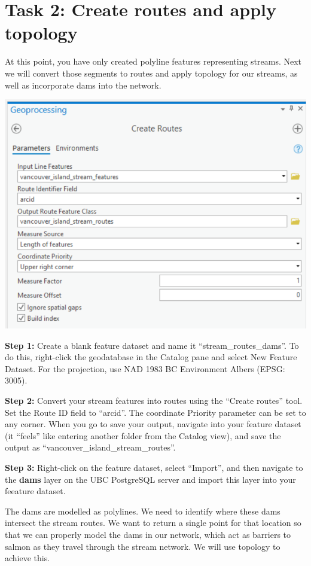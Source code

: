 \documentclass[
]{book}
\begin{document}
\hypertarget{task-2-create-routes-and-apply-topology}{%
\section*{Task 2: Create routes and apply topology}\label{task-2-create-routes-and-apply-topology}}

At this point, you have only created polyline features representing streams. Next we will convert those segments to routes and apply topology for our streams, as well as incorporate dams into the network.

\includegraphics[width=0.75\linewidth]{images/02-create-routes}

\textbf{Step 1:} Create a blank feature dataset and name it ``stream\_routes\_dams''. To do this, right-click the geodatabase in the Catalog pane and select New Feature Dataset. For the projection, use NAD 1983 BC Environment Albers (EPSG: 3005).

\textbf{Step 2:} Convert your stream features into routes using the ``Create routes'' tool. Set the Route ID field to ``arcid''. The coordinate Priority parameter can be set to any corner. When you go to save your output, navigate into your feature dataset (it ``feels'' like entering another folder from the Catalog view), and save the output as ``vancouver\_island\_stream\_routes''.

\textbf{Step 3:} Right-click on the feature dataset, select ``Import'', and then navigate to the \textbf{dams} layer on the UBC PostgreSQL server and import this layer into your feeature dataset.

The dams are modelled as polylines. We need to identify where these dams intersect the stream routes. We want to return a single point for that location so that we can properly model the dams in our network, which act as barriers to salmon as they travel through the stream network. We will use topology to achieve this.
\end{document}
